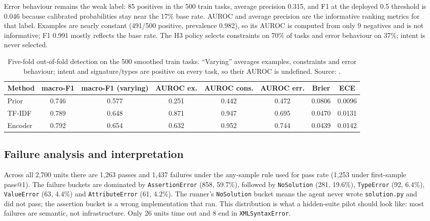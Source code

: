 \documentclass{article}
\begin{document}
Error behaviour remains the weak label: 85 positives in the 500 train tasks, average
precision 0.315, and F1 at the deployed 0.5 threshold is 0.046 because calibrated
probabilities stay near the 17\% base rate. AUROC and average precision are the informative
ranking metrics for that label. Examples are nearly constant (491/500 positive, prevalence
0.982), so its AUROC is computed from only 9 negatives and is not informative; F1 0.991 mostly
reflects the base rate. The H3 policy selects constraints on 70\% of tasks and
error behaviour on 37\%; intent is never selected.

\begin{table}[!ht]
  \centering
  \small
  \setlength{\tabcolsep}{3.5pt}
  \begin{tabular}{@{}lccccccc@{}}
    \toprule
    Method & macro-F1 & macro-F1 (varying) & AUROC ex. & AUROC cons. & AUROC err. & Brier & ECE \\
    \midrule
    Prior & 0.746 & 0.577 & 0.251 & 0.442 & 0.472 & 0.0806 & 0.0096 \\
    TF-IDF & 0.789 & 0.648 & 0.871 & 0.947 & 0.695 & 0.0470 & 0.0131 \\
    Encoder & 0.792 & 0.654 & 0.632 & 0.952 & 0.744 & 0.0439 & 0.0142 \\
    \bottomrule
  \end{tabular}
  \caption{Five-fold out-of-fold detection on the 500 smoothed train tasks. ``Varying'' averages
  examples, constraints and error behaviour; intent and signature/types are positive on every
  task, so their AUROC is undefined. Source:
  \protect{}.}
  \label{tab:detector}
\end{table}

\subsection{Failure analysis and interpretation}

Across all 2{,}700 units there are 1{,}263 passes and 1{,}437 failures under the any-sample
rule used for pass rate (1{,}253 under first-sample pass@1). The failure buckets are dominated
by \texttt{AssertionError} (858, 59.7\%), followed by \texttt{NoSolution} (281,
19.6\%), \texttt{TypeError} (92, 6.4\%), \texttt{ValueError} (63, 4.4\%) and
\texttt{AttributeError} (61, 4.2\%). The runner's \texttt{NoSolution} bucket means the agent
never wrote \texttt{solution.py} and did not pass; the assertion bucket is a wrong
implementation that ran. This distribution is what a hidden-suite pilot should look like: most
failures are semantic, not infrastructure. Only 26 units time out and 8 end in
\texttt{XMLSyntaxError}.
\end{document}

